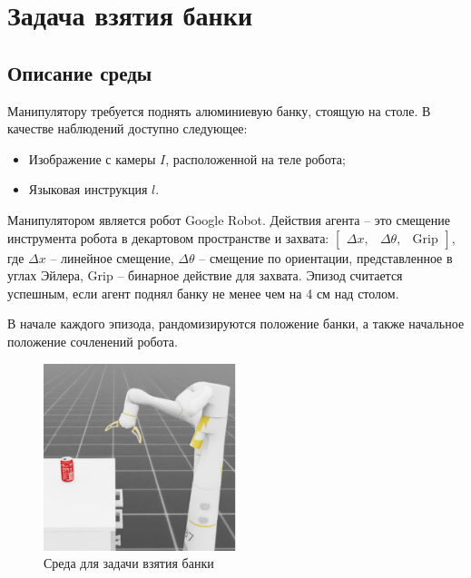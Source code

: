     \section{Задача взятия банки}

        \subsection{Описание среды}

            Манипулятору требуется поднять алюминиевую банку, стоящую на столе. В качестве наблюдений доступно следующее:

            \begin{itemize}
                \item Изображение с камеры $I$, расположенной на теле робота;
                \item Языковая инструкция $l$.
            \end{itemize}

            Манипулятором является робот Google Robot. Действия агента -- это смещение инструмента робота в декартовом пространстве и захвата: $\begin{bmatrix} \Delta x, & \Delta \theta, & \text{Grip} \end{bmatrix}$, где $\Delta x$ -- линейное смещение, $\Delta \theta$ -- смещение по ориентации, представленное в углах Эйлера, $\text{Grip}$ -- бинарное действие для захвата. Эпизод считается успешным, если агент поднял банку не менее чем на 4 см над столом. 
            
            В начале каждого эпизода, рандомизируются положение банки, а также начальное положение сочленений робота. 

            \begin{figure}[h]
                \begin{center}
                    \includegraphics[width=0.5\textwidth]{images/task2.jpg}
                \caption{Среда для задачи взятия банки}
                \end{center}
                \end{figure}

